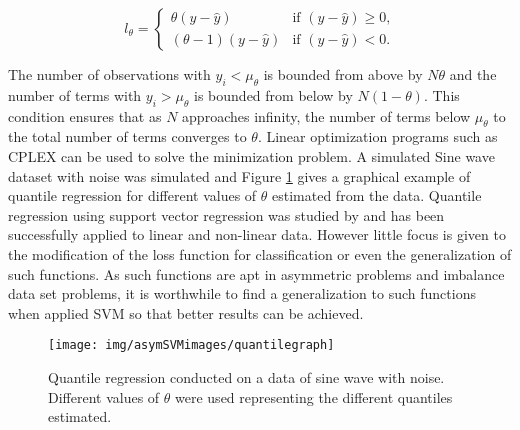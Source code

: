 \documentclass[twoside,11pt]{article}
\begin{document}
\begin{equation}\label{Eq:pinball}
l_{\theta}=
\begin{cases} \theta (y-\hat{y}) & \text{if $(y-\hat{y})\geq 0$,}
\\
 (\theta - 1) (y-\hat{y})  &\text{if $(y-\hat{y})< 0$.}
\end{cases}
\end{equation}

The number of observations with $y_i < \mu_{\theta}$ is bounded from above by $N\theta$ and the number of terms with $y_i > \mu_{\theta}$ is bounded from below by $N(1-\theta)$. This condition ensures that as $N$ approaches infinity, the number of terms below $\mu_{\theta}$ to the total number of terms converges to $\theta$. Linear optimization programs such as CPLEX can be used to solve the minimization problem. A simulated Sine wave dataset with noise was simulated and Figure \ref{Fig:Quantile Regression} gives a graphical example of quantile regression for different values of $\theta$ estimated from the data. Quantile regression using support vector regression was studied by \citet{Changha05} and has been successfully applied to linear and non-linear data. However little focus is given to the modification of the loss function for classification or even the generalization of such functions. As such functions are apt in asymmetric problems and imbalance data set problems, it is worthwhile to find a generalization to such functions when applied SVM so that better results can be achieved. 

\begin{figure}
 \centering
\texttt{[image: img/asymSVMimages/quantilegraph]}\\
 \caption{Quantile regression conducted on a data of sine wave with noise. Different values of $\theta$ were used representing the different quantiles estimated.}
 \label{Fig:Quantile Regression}
\end{figure}
\end{document}
